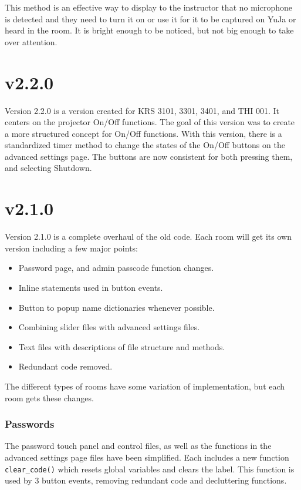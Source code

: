\documentclass{article}
\begin{document}
This method is an effective way to display to the instructor that no microphone is detected and they need to turn it on 
or use it for it to be captured on YuJa or heard in the room. It is bright enough to be noticed, but not big enough to 
take over attention. 

\section*{v2.2.0}

Version 2.2.0 is a version created for KRS 3101, 3301, 3401, and THI 001. It centers on the projector On/Off functions. 
The goal of this version was to create a more structured concept for On/Off functions. With this version, there is a 
standardized timer method to change the states of the On/Off buttons on the advanced settings page. The buttons are 
now consistent for both pressing them, and selecting Shutdown. 

\section*{v2.1.0}

Version 2.1.0 is a complete overhaul of the old code. Each room will get its own version including a few major points:

\begin{itemize}
    \item Password page, and admin passcode function changes.
    \item Inline statements used in button events. 
    \item Button to popup name dictionaries whenever possible.
    \item Combining slider files with advanced settings files.
    \item Text files with descriptions of file structure and methods. 
    \item Redundant code removed.
\end{itemize}

The different types of rooms have some variation of implementation, but each room gets these changes. 

\subsubsection*{Passwords}

The password touch panel and control files, as well as the functions in the advanced settings page files have been simplified.
Each includes a new function \lstinline|clear_code()| which resets global variables and clears the label. This function is 
used by 3 button events, removing redundant code and decluttering functions. 
\end{document}
